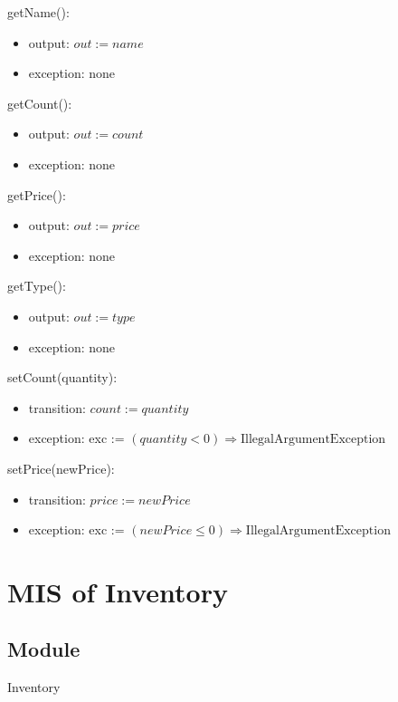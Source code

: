 \documentclass[12pt, titlepage]{article}
\begin{document}
\noindent getName():
\begin{itemize}
\item output: $out := \mathit{name}$
\item exception: none
\end{itemize}

\noindent getCount():
\begin{itemize}
\item output: $out := \mathit{count}$
\item exception: none
\end{itemize}

\noindent getPrice():
\begin{itemize}
\item output: $out := \mathit{price}$
\item exception: none
\end{itemize}


\noindent getType():
\begin{itemize}
\item output: $out := \mathit{type}$
\item exception: none
\end{itemize}

\noindent setCount(quantity):
\begin{itemize}
\item transition: $\mathit{count}:= \mathit{quantity}$
\item exception: exc := $ (\mathit{quantity} < 0) \Rightarrow
  \text{IllegalArgumentException}$

\end{itemize}

\noindent setPrice(newPrice):
\begin{itemize}
\item transition: $\mathit{price}:= \mathit{newPrice}$
\item exception: exc := $ (\mathit{newPrice} \le 0) \Rightarrow
  \text{IllegalArgumentException}$
\end{itemize}


\newpage

\section{MIS of Inventory} 


\subsection{Module}
Inventory
\end{document}

